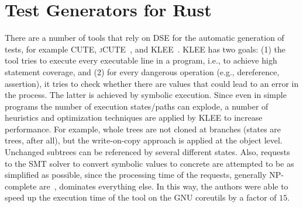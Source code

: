 \documentclass[paper=a4,%
  twoside,%
  BCOR4mm,%
  abstract=true,%
  toc=bibliography,%
  chapterprefix=true,%
  toc=bibliographynumbered,%
  open=right,%
  english,%
  pagesize=pdftex]{scrreprt}
\begin{document}
\section{Test Generators for Rust}

There are a number of tools that rely on \ac{DSE} for the automatic generation of tests, for example \textsc{CUTE}, \textsc{jCUTE}~\cite{Sen2006}, and \textsc{KLEE}~\cite{cadar2008klee}. \textsc{KLEE} has two goals: (1) the tool tries to execute every executable line in a program, i.e., to achieve high statement coverage, and (2) for every dangerous operation (e.g., dereference, assertion), it tries to check whether there are values that could lead to an error in the process. The latter is achieved by symbolic execution. Since even in simple programs the number of execution states/paths can explode, a number of heuristics and optimization techniques are applied by \textsc{KLEE} to increase performance. For example, whole trees are not cloned at branches (states are trees, after all), but the write-on-copy approach is applied at the object level. Unchanged subtrees can be referenced by several different states. Also, requests to the \ac{SMT} solver to convert symbolic values to concrete are attempted to be as simplified as possible, since the processing time of the requests, generally NP-complete are~\cite{Lewis1983}, dominates everything else. In this way, the authors were able to speed up the execution time of the tool on the GNU coreutils by a factor of $15$.
\end{document}
